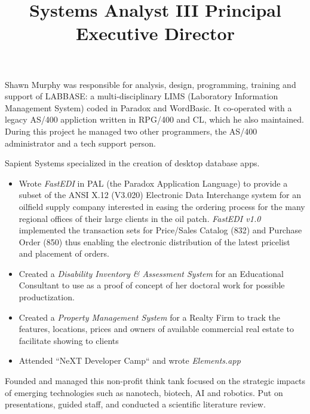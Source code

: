 \documentclass[line,margin]{res}
\begin{document}
\begin{resume}
\begin{position}
\end{position}



\title{Systems Analyst III}
\begin{position}
  Shawn Murphy was responsible for analysis, design, programming, training and support of LABBASE:
  a multi-disciplinary LIMS (Laboratory Information Management System)
  coded in Paradox and WordBasic.
  It co-operated with a legacy AS/400 appliction written in RPG/400 and CL,
  which he also maintained.
  During this project he managed two other programmers, the AS/400 administrator and a
  tech support person.
\end{position}


\title{ Principal }
\begin{position}
Sapient Systems specialized in the creation of desktop database apps.
\begin{itemize}
\item Wrote {\it FastEDI} in PAL (the Paradox Application Language)  to
	provide a subset of the
	ANSI X.12 (V3.020) Electronic Data Interchange system for an
	oilfield supply company interested in easing the ordering process for
	the many regional offices of their large clients in the oil patch.
	{\it FastEDI v1.0} implemented
	the transaction sets for Price/Sales Catalog (832) and
	Purchase Order (850) thus enabling the electronic distribution
	of the latest pricelist and placement of orders.
\item Created a {\it Disability Inventory \& Assessment System }
	for an Educational Consultant to use as a proof of concept of
	her doctoral work for possible productization.
\item Created a {\it Property Management System} for a Realty Firm to
	track the features, locations, prices and owners of
	available commercial real estate to facilitate showing to clients
\item Attended ``NeXT Developer Camp`` and wrote \emph{Elements.app}
\end{itemize}
\end{position}


\title{ Executive Director }
\begin{position}
  Founded and managed this non-profit think tank focused on the strategic impacts of
  emerging technologies such as nanotech, biotech, AI and robotics.
  Put on presentations, guided staff, and conducted a scientific literature review.
\end{position}



\end{resume}
\end{document}
